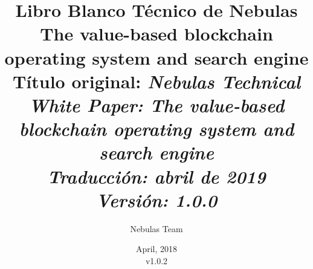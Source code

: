 \documentclass[11.5pt]{article}
\begin{document}
\renewcommand\contentsname{Tabla de contenidos}
\renewcommand\refname{Referencias}
\renewcommand\appendixname{Anexo}
\renewcommand\appendixpagename{Anexos}
\renewcommand{\abstractname}{Resumen}
\renewcommand{\nomname}{Glosario}
\renewcommand{\figurename}{Fig.}
\renewcommand{\tablename}{Tabla}
\renewcommand{\baselinestretch}{1.5}
\newcommand{\dapp}{DApp\xspace}
\newcommand{\pidc}{Protocolo de Incentivos para Desarrolladores\xspace}

\title{
	Libro Blanco Técnico de Nebulas \\
	\large The value-based blockchain operating system and search engine\\
	\small Título original: \textit{Nebulas Technical White Paper: The value-based blockchain operating system and search engine\\
	    Traducción: abril de 2019\\
    Versión: 1.0.0}}
\author{Nebulas Team}
\date{April, 2018\\v1.0.2}
\maketitle

\newpage
\tableofcontents

\printnomenclature

\newpage
\newpage
\newpage
\newpage
\newpage
\newpage
\newpage
\newpage
\newpage
\printbibliography

\begin{appendices}
\end{appendices}

\end{document}
